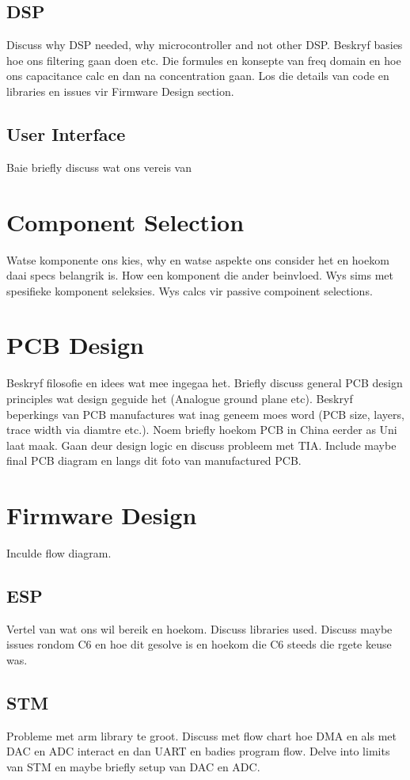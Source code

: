 \subsection{DSP}
Discuss why DSP needed, why microcontroller and not other DSP. Beskryf basies hoe ons filtering gaan doen etc. Die formules en konsepte van freq domain en hoe ons capacitance calc en dan na concentration gaan. Los die details van code en libraries en issues vir Firmware Design section.

\subsection{User Interface}
Baie briefly discuss wat ons vereis van

\section{Component Selection}
Watse komponente ons kies, why en watse aspekte ons consider het en hoekom daai specs belangrik is. How een komponent die ander beinvloed. Wys sims met spesifieke komponent seleksies. Wys calcs vir passive compoinent selections.

\section{PCB Design}
Beskryf filosofie en idees wat mee ingegaa het. Briefly discuss general PCB design principles wat design geguide het (Analogue ground plane etc). Beskryf beperkings van PCB manufactures wat inag geneem moes word (PCB size, layers, trace width via diamtre etc.). Noem briefly hoekom PCB in China eerder as Uni laat maak. Gaan deur design logic en discuss probleem met TIA. Include maybe final PCB diagram en langs dit foto van manufactured PCB.

\section{Firmware Design}
Inculde flow diagram.

\subsection{ESP}
Vertel van wat ons wil bereik en hoekom. Discuss libraries used. Discuss maybe issues rondom C6 en hoe dit gesolve is en hoekom die C6 steeds die rgete keuse was.

\subsection{STM}
Probleme met arm library te groot. Discuss met flow chart hoe DMA en als met DAC en ADC interact en dan UART en badies program flow. Delve into limits van STM en maybe briefly setup van DAC en ADC.

\label{chap:design}